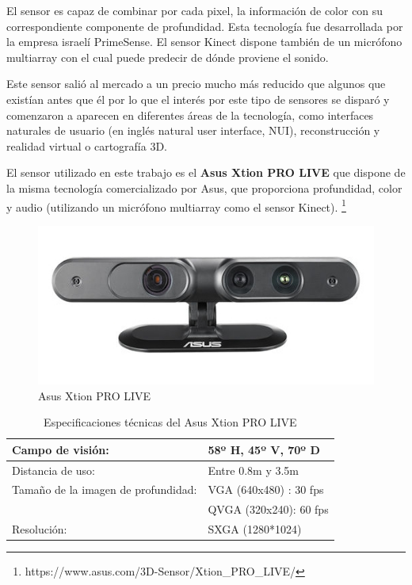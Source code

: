 El sensor es capaz de combinar por cada pixel, la información de color con su correspondiente componente de profundidad. Esta tecnología fue desarrollada por la empresa israelí PrimeSense. El sensor Kinect dispone también de un micrófono multiarray con el cual puede predecir de dónde proviene el sonido.

Este sensor salió al mercado a un precio mucho más reducido que algunos que existían antes que él por lo que el interés por este tipo de sensores se disparó y comenzaron a aparecen en diferentes áreas de la tecnología, como interfaces naturales de usuario (en inglés natural user interface, NUI), reconstrucción y realidad virtual o cartografía 3D.

El sensor utilizado en este trabajo es el \textbf{Asus Xtion PRO LIVE} que dispone de la misma tecnología comercializado por Asus, que proporciona profundidad, color y audio (utilizando un micrófono multiarray como el sensor Kinect). \footnote{https://www.asus.com/3D-Sensor/Xtion\_PRO\_LIVE/}

\begin{figure}[th]
\centering
\includegraphics[scale=0.9]{Figures/xtion-pro-live.jpg}
\decoRule
\caption[Kinect sensor]{Asus Xtion PRO LIVE}
\label{fig:Kinect}
\end{figure}


\begin{table}
\caption{Especificaciones técnicas del Asus Xtion PRO LIVE}
\label{tab:xtion}
\centering
\begin{tabular}{ l | l }
\toprule
Campo de visión: & 58º H, 45º V, 70º D\\
\hline
Distancia de uso: & Entre 0.8m y 3.5m\\
\hline
Tamaño de la imagen de profundidad: & VGA (640x480) : 30 fps \\
				& QVGA (320x240): 60 fps\\
\hline
Resolución: & SXGA (1280*1024) \\
\bottomrule
\end{tabular}
\end{table}

